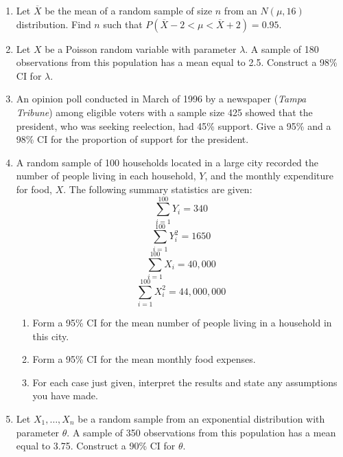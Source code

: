 \begin{enumerate}
    \item[\textbf{5.5.13.}] Let $\overline{X}$ be the mean of a random sample of size $n$ from an $N(\mu,16)$ distribution. Find $n$ such that $P(\overline{X}-2<\mu<\overline{X}+2)=0.95$.
    \item[\textbf{5.5.14.}] Let $X$ be a Poisson random variable with parameter $\lambda$. A sample of 180 observations from this population has a mean equal to 2.5. Construct a 98\% CI for $\lambda$.
    \item[\textbf{5.5.15.}] An opinion poll conducted in March of 1996 by a newspaper (\textit{Tampa Tribune}) among eligible voters with a sample size 425 showed that the president, who was seeking reelection, had 45\% support. Give a 95\% and a 98\% CI for the proportion of support for the president.
    \item[\textbf{5.5.16.}] A random sample of 100 households located in a large city recorded the number of people living in each household, $Y$, and the monthly expenditure for food, $X$. The following summary statistics are given:
    \[
        \sum_{i=1}^{100} Y_i = 340
    \]
    \[
        \sum_{i=1}^{100} Y_i^2 = 1650
    \]
    \[
        \sum_{i=1}^{100} X_i = 40{,}000
    \]
    \[
        \sum_{i=1}^{100} X_i^2 = 44{,}000{,}000
    \]
    \begin{enumerate}
        \item[\textbf{(a)}] Form a 95\% CI for the mean number of people living in a household in this city.
        \item[\textbf{(b)}] Form a 95\% CI for the mean monthly food expenses.
        \item[\textbf{(c)}] For each case just given, interpret the results and state any assumptions you have made.
    \end{enumerate}
    \item[\textbf{5.5.17.}] Let $X_1,\ldots,X_n$ be a random sample from an exponential distribution with parameter $\theta$. A sample of 350 observations from this population has a mean equal to 3.75. Construct a 90\% CI for $\theta$.
\end{enumerate}
